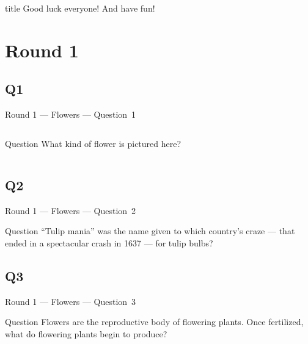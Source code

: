 \documentclass[11pt]{beamer}
\begin{document}
\begingroup{}
\begin{frame}
\vfill{}
\begin{beamercolorbox}[sep=8pt,center,shadow=true,rounded=true]{title}
Good luck everyone! And have fun!
\end{beamercolorbox}
\vfill{}
\end{frame}
\endgroup{}
\def\thisSectionName{Flowers}
\section{Round 1}
\subsection*{Q1}
\begin{frame}[t]{Round 1 --- Flowers --- \mbox{Question 1}}
\vspace{-0.5em}
\begin{columns}[T,totalwidth=\linewidth]
\begin{column}{0.32\linewidth}
\begin{block}{Question}
What kind of flower is pictured here?
\end{block}
\end{column}
\begin{column}{0.65\linewidth}
\begin{center}
\texttt{[image: \{Images/bop]}.jpg}
\end{center}
\end{column}
\end{columns}
\end{frame}
\subsection*{Q2}
\begin{frame}[t]{Round 1 --- Flowers --- \mbox{Question 2}}
\vspace{-0.5em}
\begin{block}{Question}
``Tulip mania'' was the name given to which country's craze --- that ended in a spectacular crash in 1637 --- for tulip bulbs?
\end{block}
\end{frame}
\subsection*{Q3}
\begin{frame}[t]{Round 1 --- Flowers --- \mbox{Question 3}}
\vspace{-0.5em}
\begin{block}{Question}
Flowers are the reproductive body of flowering plants. Once  fertilized, what do flowering plants begin to produce?
\end{block}
\end{frame}
\end{document}
